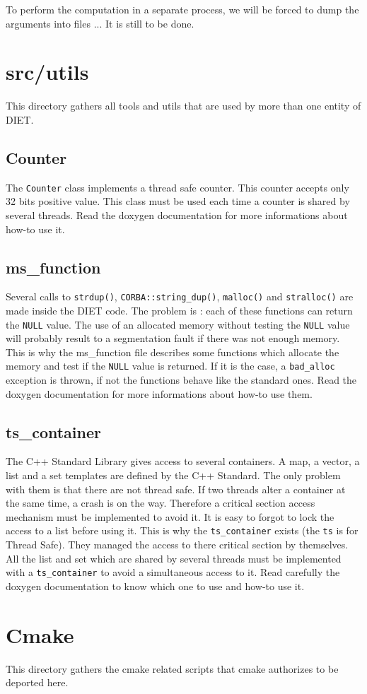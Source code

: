   To perform the computation in a separate process, we will be forced to dump the
  arguments into files ... It is still to be done.


  \section{\textsf{src/utils}}
  \label{s:utils}

  This directory gathers all tools and utils that are used by more than one
  entity of DIET.


  \subsection{\textsf{Counter}}

  The \texttt{Counter} class implements a thread safe counter. This counter
  accepts only 32 bits positive value. This class must be used each time a
  counter is shared by several threads. Read the doxygen documentation for more
  informations about how-to use it.

  \subsection{\textsf{ms\_function}}

  Several calls to \texttt{strdup()}, \texttt{CORBA::string\_dup()},
  \texttt{malloc()} and \texttt{stralloc()} are made inside the DIET code. The
  problem is : each of these functions can return the \texttt{NULL} value. The
  use of an allocated memory without testing the \texttt{NULL} value will
  probably result to a segmentation fault if there was not enough memory. This
  is why the \textsf{ms\_function} file describes some functions which allocate
  the memory and test if the \texttt{NULL} value is returned. If it is the case,
  a \texttt{bad\_alloc} exception is thrown, if not the functions behave like the
  standard ones. Read the doxygen documentation for more informations about
  how-to use them.

  \subsection{\textsf{ts\_container}}

  The C++ Standard Library gives access to several containers. A map, a vector, a
  list and a set templates are defined by the C++ Standard. The only problem with
  them is that there are not thread safe. If two threads alter a container at the
  same time, a crash is on the way. Therefore a critical section access mechanism
  must be implemented to avoid it. It is easy to forgot to lock the access to a
  list before using it. This is why the \texttt{ts\_container} exists (the
      \texttt{ts} is for Thread Safe). They managed the access to there critical
  section by themselves. All the list and set which are shared by several threads
  must be implemented with a \texttt{ts\_container} to avoid a simultaneous
  access to it. Read carefully the doxygen documentation to know which one to use
  and how-to use it.

\section{\textsf{Cmake}}
\label{s:Cmake}

This directory gathers the cmake related scripts that cmake authorizes to
be deported here.

